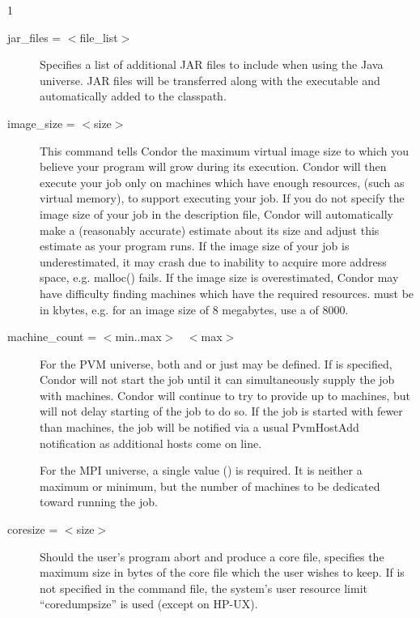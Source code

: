 \begin{ManPage}{\label{man-condor-submit}}{1}
\begin{description}

\item[jar\_files = $<$file\_list$>$]
Specifies a list of additional JAR files to include when using
the Java universe.  JAR files will be transferred along with
the executable and automatically added to the classpath.


\item[image\_size = $<$size$>$] This command tells Condor the maximum
virtual image size to which you believe your program will grow during
its execution. Condor will then execute your job only on machines which
have enough resources, (such as virtual memory), to support executing
your job. If you do not specify the image size of your job in the
description file, Condor will automatically make a (reasonably accurate)
estimate about its size and adjust this estimate as your program runs.
If the image size of your job is underestimated, it may crash due to
inability to acquire more address space, e.g. malloc() fails. If the image
size is overestimated, Condor may have difficulty finding machines which
have the required resources.  must be in kbytes, e.g. for
an image size of 8 megabytes, use a  of 8000.


\item[machine\_count = $<$min..max$>$ \Bar\ $<$max$>$] 
For the PVM universe,
both  and  or just
 may be defined. 
If  is
specified, Condor will not start the job until it can simultaneously
supply the job with  machines.  Condor will continue to try 
to provide up
to  machines, but will not delay starting of the job to do so.
If the job is started with fewer than  machines, the job
will be notified via a usual PvmHostAdd notification as additional
hosts come on line.

For the MPI universe, a single value () is required.
It is neither a maximum or minimum, but 
the number of machines to be dedicated toward running the job.


\item[coresize = $<$size$>$] Should the user's program abort and produce
a core file,  specifies the maximum size in bytes of the
core file which the user wishes to keep. If  is not
specified in the command file, the system's user resource limit
\mbox{``coredumpsize''} is used (except on HP-UX). 


\end{description}
\end{ManPage}
